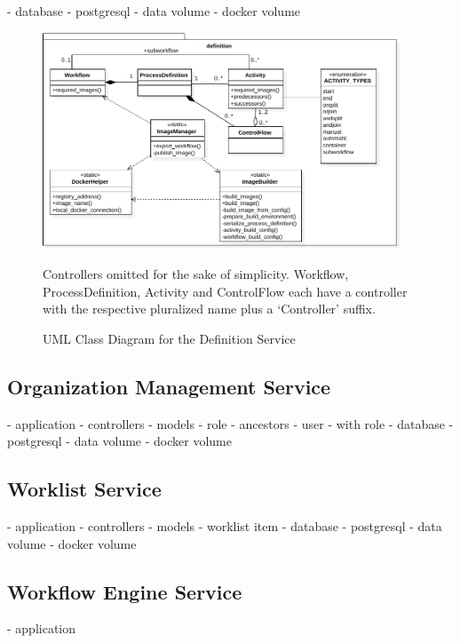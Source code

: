       - database
        - postgresql
      - data volume
        - docker volume

    \begin{figure}[htbp]
      \centering

      \includegraphics[width=0.95\textwidth]{content/images/class_diagram_definition-crop.pdf}
      \caption*{\scriptsize Controllers omitted for the sake of simplicity. Workflow, ProcessDefinition, Activity and ControlFlow each have a controller with the respective pluralized name plus a `Controller' suffix.}
      \caption{UML Class Diagram for the Definition Service}
      \label{fig:label}
    \end{figure}

  \subsection{Organization Management Service} %
    \label{sub:organization_management_service}
      - application
        - controllers
        - models
          - role
            - ancestors
          - user
            - with role
      - database
        - postgresql
      - data volume
        - docker volume

  \subsection{Worklist Service} %
    \label{sub:worklist_service}
      - application
        - controllers
        - models
          - worklist item
      - database
        - postgresql
      - data volume
        - docker volume

  \subsection{Workflow Engine Service} %
    \label{sub:workflow_engine_service}
      - application

